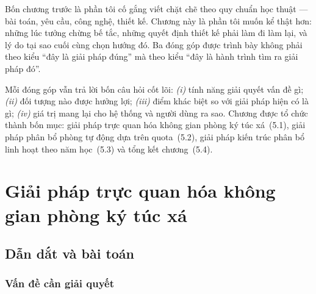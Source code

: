 \documentclass[../DoAn.tex]{subfiles}
\begin{document}
\sloppy

\SetAlgoNoLine  %
\SetAlgoSkip{}          %
\setlength{\algomargin}{1em}  %

Bốn chương trước là phần tôi cố gắng viết chặt chẽ theo quy chuẩn học thuật
--- bài toán, yêu cầu, công nghệ, thiết kế. Chương này là phần tôi muốn kể
thật hơn: những lúc tưởng chừng bế tắc, những quyết định thiết kế phải làm
đi làm lại, và lý do tại sao cuối cùng chọn hướng đó. Ba đóng góp được trình
bày không phải theo kiểu ``đây là giải pháp đúng'' mà theo kiểu ``đây là hành
trình tìm ra giải pháp đó''.

Mỗi đóng góp vẫn trả lời bốn câu hỏi cốt lõi: \textit{(i)} tính năng giải
quyết vấn đề gì; \textit{(ii)} đối tượng nào được hưởng lợi; \textit{(iii)}
điểm khác biệt so với giải pháp hiện có là gì; \textit{(iv)} giá trị mang lại
cho hệ thống và người dùng ra sao. Chương được tổ chức thành bốn mục: giải
pháp trực quan hóa không gian phòng ký túc xá~(5.1), giải pháp phân bổ phòng
tự động dựa trên quota~(5.2), giải pháp kiến trúc phân bổ linh hoạt theo năm
học~(5.3) và tổng kết chương~(5.4).

\section{Giải pháp trực quan hóa không gian phòng ký túc xá}
\label{sec:contrib_visualization}

\subsection{Dẫn dắt và bài toán}
\label{subsec:viz_problem}

\subsubsection{Vấn đề cần giải quyết}
\end{document}
